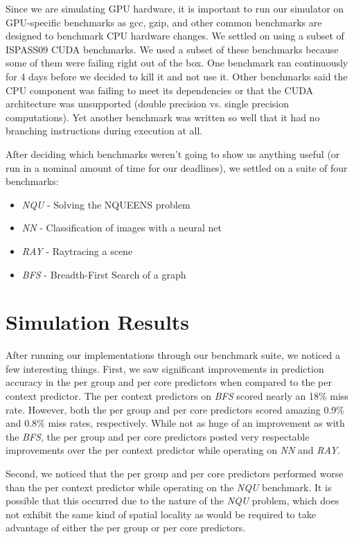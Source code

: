 \documentclass[conference]{IEEEtran}
\begin{document}
Since we are simulating GPU hardware, it is important to run our simulator on GPU-specific benchmarks as gcc, gzip, and other common benchmarks are designed to benchmark CPU hardware changes.  We settled on using a subset of ISPASS09 CUDA benchmarks.  We used a subset of these benchmarks because some of them were failing right out of the box.  One benchmark ran continuously for 4 days before we decided to kill it and not use it.  Other benchmarks said the CPU component was failing to meet its dependencies or that the CUDA architecture was unsupported (double precision vs. single precision computations).  Yet another benchmark was written so well that it had no branching instructions during execution at all.

After deciding which benchmarks weren't going to show us anything useful (or run in a nominal amount of time for our deadlines), we settled on a suite of four benchmarks:

\begin{itemize}
	\item \emph{NQU} - Solving the NQUEENS problem
	\item \emph{NN} - Classification of images with a neural net
	\item \emph{RAY} - Raytracing a scene
	\item \emph{BFS} - Breadth-First Search of a graph
\end{itemize}

\section{Simulation Results}

After running our implementations through our benchmark suite, we noticed a few interesting things.  First, we saw significant improvements in prediction accuracy in the per group and per core predictors when compared to the per context predictor.  The per context predictors on \emph{BFS} scored nearly an 18\% miss rate.  However, both the per group and per core predictors scored amazing 0.9\% and 0.8\% miss rates, respectively.  While not as huge of an improvement as with the \emph{BFS}, the per group and per core predictors posted very respectable improvements over the per context predictor while operating on \emph{NN} and \emph{RAY}.

Second, we noticed that the per group and per core predictors performed worse than the per context predictor while operating on the \emph{NQU} benchmark.  It is possible that this occurred due to the nature of the \emph{NQU} problem, which does not exhibit the same kind of spatial locality as would be required to take advantage of either the per group or per core predictors.
\end{document}
